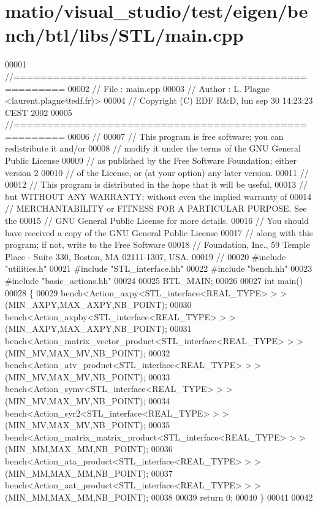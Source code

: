 \hypertarget{matio_2visual__studio_2test_2eigen_2bench_2btl_2libs_2_s_t_l_2main_8cpp_source}{}\section{matio/visual\+\_\+studio/test/eigen/bench/btl/libs/\+S\+T\+L/main.cpp}
\label{matio_2visual__studio_2test_2eigen_2bench_2btl_2libs_2_s_t_l_2main_8cpp_source}

\begin{DoxyCode}
00001 \textcolor{comment}{//=====================================================}
00002 \textcolor{comment}{// File   :  main.cpp}
00003 \textcolor{comment}{// Author :  L. Plagne <laurent.plagne@edf.fr)>}
00004 \textcolor{comment}{// Copyright (C) EDF R&D,  lun sep 30 14:23:23 CEST 2002}
00005 \textcolor{comment}{//=====================================================}
00006 \textcolor{comment}{//}
00007 \textcolor{comment}{// This program is free software; you can redistribute it and/or}
00008 \textcolor{comment}{// modify it under the terms of the GNU General Public License}
00009 \textcolor{comment}{// as published by the Free Software Foundation; either version 2}
00010 \textcolor{comment}{// of the License, or (at your option) any later version.}
00011 \textcolor{comment}{//}
00012 \textcolor{comment}{// This program is distributed in the hope that it will be useful,}
00013 \textcolor{comment}{// but WITHOUT ANY WARRANTY; without even the implied warranty of}
00014 \textcolor{comment}{// MERCHANTABILITY or FITNESS FOR A PARTICULAR PURPOSE.  See the}
00015 \textcolor{comment}{// GNU General Public License for more details.}
00016 \textcolor{comment}{// You should have received a copy of the GNU General Public License}
00017 \textcolor{comment}{// along with this program; if not, write to the Free Software}
00018 \textcolor{comment}{// Foundation, Inc., 59 Temple Place - Suite 330, Boston, MA  02111-1307, USA.}
00019 \textcolor{comment}{//}
00020 \textcolor{preprocessor}{#include "utilities.h"}
00021 \textcolor{preprocessor}{#include "STL\_interface.hh"}
00022 \textcolor{preprocessor}{#include "bench.hh"}
00023 \textcolor{preprocessor}{#include "basic\_actions.hh"}
00024 
00025 BTL\_MAIN;
00026 
00027 \textcolor{keywordtype}{int} main()
00028 \{
00029   bench<Action\_axpy<STL\_interface<REAL\_TYPE> > >(MIN\_AXPY,MAX\_AXPY,NB\_POINT);
00030   bench<Action\_axpby<STL\_interface<REAL\_TYPE> > >(MIN\_AXPY,MAX\_AXPY,NB\_POINT);
00031   bench<Action\_matrix\_vector\_product<STL\_interface<REAL\_TYPE> > >(MIN\_MV,MAX\_MV,NB\_POINT);
00032   bench<Action\_atv\_product<STL\_interface<REAL\_TYPE> > >(MIN\_MV,MAX\_MV,NB\_POINT);
00033   bench<Action\_symv<STL\_interface<REAL\_TYPE> > >(MIN\_MV,MAX\_MV,NB\_POINT);
00034   bench<Action\_syr2<STL\_interface<REAL\_TYPE> > >(MIN\_MV,MAX\_MV,NB\_POINT);
00035   bench<Action\_matrix\_matrix\_product<STL\_interface<REAL\_TYPE> > >(MIN\_MM,MAX\_MM,NB\_POINT);
00036   bench<Action\_ata\_product<STL\_interface<REAL\_TYPE> > >(MIN\_MM,MAX\_MM,NB\_POINT);
00037   bench<Action\_aat\_product<STL\_interface<REAL\_TYPE> > >(MIN\_MM,MAX\_MM,NB\_POINT);
00038 
00039   \textcolor{keywordflow}{return} 0;
00040 \}
00041 
00042 
\end{DoxyCode}

